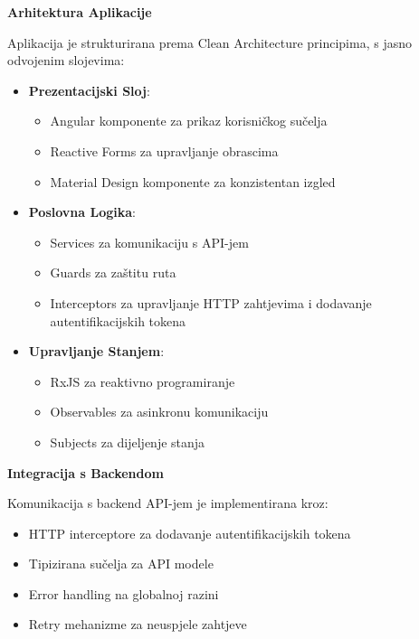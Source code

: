 \documentclass[a4paper,12pt]{article}
\begin{document}
\noindent\textbf{Arhitektura Aplikacije}

Aplikacija je strukturirana prema Clean Architecture principima, s jasno odvojenim slojevima:

\begin{itemize}
    \item \textbf{Prezentacijski Sloj}:
        \begin{itemize}
            \item Angular komponente za prikaz korisničkog sučelja
            \item Reactive Forms za upravljanje obrascima
            \item Material Design komponente za konzistentan izgled
        \end{itemize}
    
    \item \textbf{Poslovna Logika}:
        \begin{itemize}
            \item Services za komunikaciju s API-jem
            \item Guards za zaštitu ruta
            \item Interceptors za upravljanje HTTP zahtjevima i dodavanje autentifikacijskih tokena
        \end{itemize}
    
    \item \textbf{Upravljanje Stanjem}:
        \begin{itemize}
            \item RxJS za reaktivno programiranje
            \item Observables za asinkronu komunikaciju
            \item Subjects za dijeljenje stanja
        \end{itemize}
\end{itemize}

\noindent\textbf{Integracija s Backendom}

Komunikacija s backend API-jem je implementirana kroz:

\begin{itemize}
    \item HTTP interceptore za dodavanje autentifikacijskih tokena
    \item Tipizirana sučelja za API modele
    \item Error handling na globalnoj razini
    \item Retry mehanizme za neuspjele zahtjeve
\end{itemize}
\end{document}
